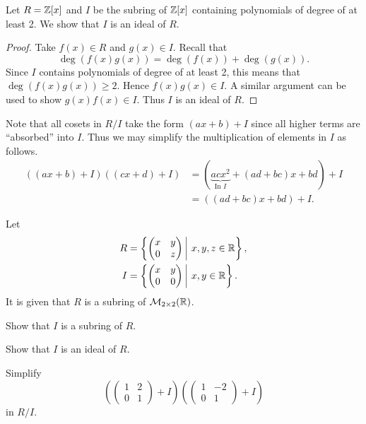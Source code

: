 \begin{example}
    Let $R = \mathbb{Z}[x]$ and $I$ be the subring of $\mathbb{Z}[x]$ containing polynomials of degree of at least 2. We show that $I$ is an ideal of $R$.
    \begin{proof}
        Take $f(x) \in R$ and $g(x) \in I$. Recall that
        \[
            \deg(f(x)g(x)) = \deg(f(x)) + \deg(g(x)).
        \]
        Since $I$ contains polynomials of degree of at least 2, this means that $\deg(f(x)g(x)) \geq 2$. Hence $f(x)g(x) \in I$. A similar argument can be used to show $g(x)f(x) \in I$. Thus $I$ is an ideal of $R$.
    \end{proof}
    Note that all cosets in $R/I$ take the form $(ax+b) + I$ since all higher terms are ``absorbed'' into $I$. Thus we may simplify the multiplication of elements in $I$ as follows.
    \begin{align*}
        ((ax+b)+I)((cx+d)+I) &= (\underbrace{acx^2}_{\text{In } I} + (ad+bc)x + bd) + I\\
        &= ((ad+bc)x + bd) + I.
    \end{align*}
\end{example}
\begin{exercise}
    Let
    \begin{align*}
        R &= \left\{\begin{pmatrix}x&y\\0&z\end{pmatrix} \vert x,y,z \in \R\right\},\\
        I &= \left\{\begin{pmatrix}x&y\\0&0\end{pmatrix} \vert x,y \in \R\right\}.
    \end{align*}
    It is given that $R$ is a subring of $\mathcal{M}_{2\times2}(\mathbb{R})$.
    \begin{partquestions}{\roman*}
        \item Show that $I$ is a subring of $R$.
        \item Show that $I$ is an ideal of $R$.
        \item Simplify
        \[
            \left(\begin{pmatrix}1&2\\0&1\end{pmatrix} + I\right)\left(\begin{pmatrix}1&-2\\0&1\end{pmatrix} + I\right)
        \]
        in $R/I$.
    \end{partquestions}
\end{exercise}

